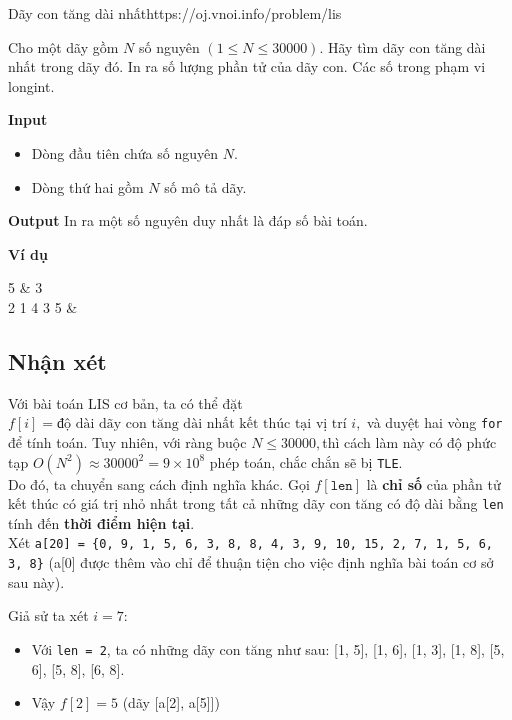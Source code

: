 \begin{baitap}{Dãy con tăng dài nhất}{https://oj.vnoi.info/problem/lis}

Cho một dãy gồm $N$ số nguyên $(1 \leq N \leq 30000)$. Hãy tìm dãy con tăng dài nhất trong dãy đó. In ra số lượng phần tử của dãy con. Các số trong phạm vi longint.

\textbf{Input}  
\begin{itemize}[noitemsep]
  \item Dòng đầu tiên chứa số nguyên $N$.
  \item Dòng thứ hai gồm $N$ số mô tả dãy.
\end{itemize}

\textbf{Output}  
In ra một số nguyên duy nhất là đáp số bài toán.

\textbf{Ví dụ}  

\begin{sampleio}
5 & 3 \\
2 1 4 3 5 & \\
\end{sampleio}

\end{baitap}

\subsection{Nhận xét}

Với bài toán LIS cơ bản, ta có thể đặt 
$f[i] = \text{độ dài dãy con tăng dài nhất kết thúc tại vị trí } i,$
và duyệt hai vòng \texttt{for} để tính toán. Tuy nhiên, với ràng buộc $N \leq 30000,$thì cách làm này có độ phức tạp $O(N^2) \approx 30000^2 = 9 \times 10^8$ phép toán, chắc chắn sẽ bị \texttt{TLE}. \\

Do đó, ta chuyển sang cách định nghĩa khác. Gọi $f[\texttt{len}]$ là \textbf{chỉ số} của phần tử kết thúc có giá trị nhỏ nhất trong tất cả những dãy con tăng có độ dài bằng \texttt{len} tính đến \textbf{thời điểm hiện tại}.\\

Xét \texttt{a[20] = \{0, 9, 1, 5, 6, 3, 8, 8, 4, 3, 9, 10, 15, 2, 7, 1, 5, 6, 3, 8\}} (a[0] được thêm vào chỉ để thuận tiện cho việc định nghĩa bài toán cơ sở sau này).

Giả sử ta xét $i = 7:$
\begin{itemize}
  \item Với \texttt{len = 2}, ta có những dãy con tăng như sau: [1, 5], [1, 6], [1, 3], [1, 8], [5, 6], [5, 8], [6, 8].
  \item Vậy $f[2] = 5$ (dãy [a[2], a[5]])
\end{itemize}

